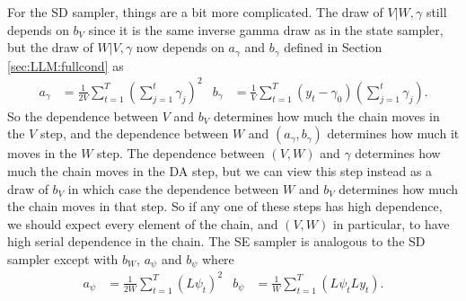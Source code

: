 \documentclass{article}
\begin{document}
For the SD sampler, things are a bit more complicated. The draw of $V|W,\gamma$ still depends on $b_V$ since it is the same inverse gamma draw as in the state sampler, but the draw of $W|V,\gamma$ now depends on $a_\gamma$ and $b_\gamma$ defined in Section \ref{sec:LLM:fullcond} as 
\begin{align*}
  a_\gamma & = \frac{1}{2V}\sum_{t=1}^T\left(\sum_{j=1}^t\gamma_j\right)^2&
  b_\gamma &= \frac{1}{V}\sum_{t=1}^T(y_t-\gamma_0)\left(\sum_{j=1}^t\gamma_j\right).
\end{align*}
So the dependence between $V$ and $b_V$ determines how much the chain moves in the $V$ step, and the dependence between $W$ and $(a_\gamma , b_\gamma)$ determines how much it moves in the $W$ step. The dependence between $(V,W)$ and $\gamma$ determines how much the chain moves in the DA step, but we can view this step instead as a draw of $b_V$ in which case the dependence between $W$ and $b_V$ determines how much the chain moves in that step. So if any one of these steps has high dependence, we should expect every element of the chain, and $(V,W)$ in particular, to have high serial dependence in the chain. The SE sampler is analogous to the SD sampler except with $b_W$, $a_\psi$ and $b_\psi$ where
\begin{align*}
  a_\psi&=\frac{1}{2W}\sum_{t=1}^T(L\psi_t)^2&
  b_\psi&=\frac{1}{W}\sum_{t=1}^T(L\psi_tLy_t).
\end{align*}
\end{document}
